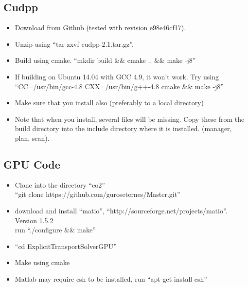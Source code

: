 \documentclass[a4paper, 11pt,utf8]{report}
\begin{document}
\subsection{Cudpp}
\begin{itemize}
\item Download from Github (tested with revision e98e46cf17). 
\item Unzip using ``tar zxvf cudpp-2.1.tar.gz''. 
\item Build using cmake. ``mkdir build \&\& cmake .. \&\& make -j8''
\item If building on Ubuntu 14.04 with GCC 4.9, it won't work. Try using ``CC=/usr/bin/gcc-4.8 CXX=/usr/bin/g++-4.8 cmake \&\& make -j8''
\item Make sure that you install also (preferably to a local directory)
\item Note that when you install, several files will be missing. Copy these from the build directory into the include directory where it is installed. (manager, plan, scan).
\end{itemize}

\subsection{GPU Code}
\begin{itemize}
\item Clone into the directory ``co2''\\
``git clone https://github.com/guroseternes/Master.git''
\item download and install ``matio'', ``http://sourceforge.net/projects/matio''. Version 1.5.2\\
run ``./configure \&\& make''
\item ``cd ExplicitTransportSolverGPU'' 
\item Make using cmake
\item Matlab may require csh to be installed, run ``apt-get install csh''
\end{itemize}
\end{document}
